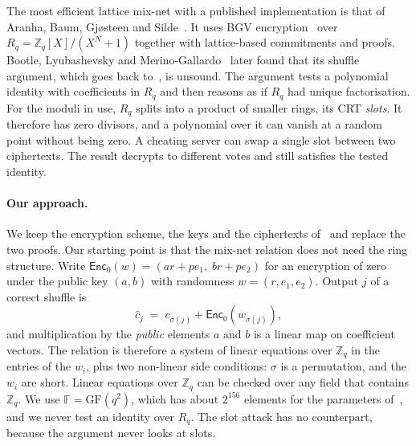 \documentclass[sigconf,anonymous]{acmart}
\newcommand{\Zq}{\mathbb{Z}_q}
\newcommand{\Rq}{R_q}
\newcommand{\F}{\mathbb{F}}
\newcommand{\EncZ}{\mathsf{Enc}_0}
\newcommand{\ch}{\hat{c}}
\begin{document}
The most efficient lattice mix-net with a published implementation is that of Aranha, Baum,
Gj{\o}steen and Silde~\cite{ABGS23}. It uses BGV encryption~\cite{BGV12} over
$\Rq=\Zq[X]/(X^N+1)$ together with lattice-based commitments and proofs. Bootle, Lyubashevsky and
Merino-Gallardo~\cite{BLM25} later found that its shuffle argument, which goes back
to~\cite{ABGSctrsa21}, is unsound. The argument tests a polynomial identity with coefficients in
$\Rq$ and then reasons as if $\Rq$ had unique factorisation. For the moduli in use, $\Rq$ splits
into a product of smaller rings, its CRT \emph{slots}. It therefore has zero divisors, and a
polynomial over it can vanish at a random point without being zero. A cheating server can swap a
single slot between two ciphertexts. The result decrypts to different votes and still satisfies
the tested identity.

\paragraph{Our approach.}
We keep the encryption scheme, the keys and the ciphertexts of~\cite{ABGS23} and replace the two
proofs. Our starting point is that the mix-net relation does not need the ring structure. Write
$\EncZ(w)=(ar+pe_1,\;br+pe_2)$ for an encryption of zero under the public key $(a,b)$ with
randomness $w=(r,e_1,e_2)$. Output $j$ of a correct shuffle is
\[
  \ch_j \;=\; c_{\sigma(j)} + \EncZ(w_{\sigma(j)}),
\]
and multiplication by the \emph{public} elements $a$ and $b$ is a linear map on coefficient vectors.
The relation is therefore a system of linear equations over $\Zq$ in the entries of the $w_i$, plus
two non-linear side conditions: $\sigma$ is a permutation, and the $w_i$ are short. Linear equations
over $\Zq$ can be checked over any field that contains $\Zq$. We use $\F=\mathrm{GF}(q^2)$, which
has about $2^{156}$ elements for the parameters of~\cite{ABGS23}, and we never test an identity over
$\Rq$. The slot attack has no counterpart, because the argument never looks at slots.
\end{document}
